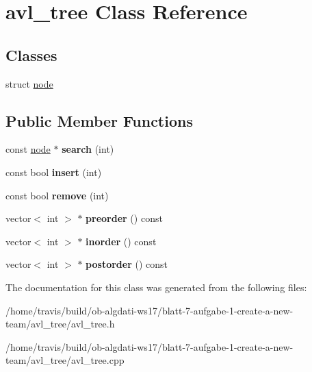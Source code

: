 \hypertarget{classavl__tree}{\section{avl\-\_\-tree Class Reference}
\label{classavl__tree}
}
\subsection*{Classes}
\begin{DoxyCompactItemize}
\item 
struct \hyperlink{structavl__tree_1_1node}{node}
\end{DoxyCompactItemize}
\subsection*{Public Member Functions}
\begin{DoxyCompactItemize}
\item 
\hypertarget{classavl__tree_a7554d1333ab18cdb9472bdfab183bf28}{const \hyperlink{structavl__tree_1_1node}{node} $\ast$ {\bfseries search} (int)}\label{classavl__tree_a7554d1333ab18cdb9472bdfab183bf28}

\item 
\hypertarget{classavl__tree_a671d955359a56db67f09bc5dea32201a}{const bool {\bfseries insert} (int)}\label{classavl__tree_a671d955359a56db67f09bc5dea32201a}

\item 
\hypertarget{classavl__tree_a6ea8ac86887224e777c3531d5fa347f8}{const bool {\bfseries remove} (int)}\label{classavl__tree_a6ea8ac86887224e777c3531d5fa347f8}

\item 
\hypertarget{classavl__tree_a54d8bd6f3b5d23e9c6ed2ca3046e2f51}{vector$<$ int $>$ $\ast$ {\bfseries preorder} () const }\label{classavl__tree_a54d8bd6f3b5d23e9c6ed2ca3046e2f51}

\item 
\hypertarget{classavl__tree_a9c35affd0642ddd8fa6e1bea92e9dfb9}{vector$<$ int $>$ $\ast$ {\bfseries inorder} () const }\label{classavl__tree_a9c35affd0642ddd8fa6e1bea92e9dfb9}

\item 
\hypertarget{classavl__tree_a153a69d4bfe9952ec59c18c76cb5932d}{vector$<$ int $>$ $\ast$ {\bfseries postorder} () const }\label{classavl__tree_a153a69d4bfe9952ec59c18c76cb5932d}

\end{DoxyCompactItemize}


The documentation for this class was generated from the following files\-:\begin{DoxyCompactItemize}
\item 
/home/travis/build/ob-\/algdati-\/ws17/blatt-\/7-\/aufgabe-\/1-\/create-\/a-\/new-\/team/avl\-\_\-tree/avl\-\_\-tree.\-h\item 
/home/travis/build/ob-\/algdati-\/ws17/blatt-\/7-\/aufgabe-\/1-\/create-\/a-\/new-\/team/avl\-\_\-tree/avl\-\_\-tree.\-cpp\end{DoxyCompactItemize}
